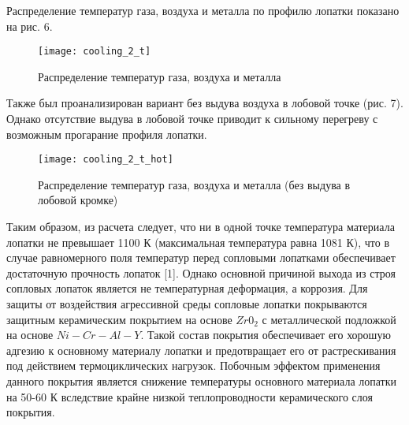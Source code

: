 Распределение температур газа, воздуха и металла по профилю лопатки показано на рис. 6.
\begin{figure}[H]
    \centering
	\texttt{[image: cooling\_2\_t]}
	\caption{Распределение температур газа, воздуха и металла}
\end{figure}

Также был проанализирован вариант без выдува воздуха в лобовой точке (рис. 7). Однако отсутствие выдува в лобовой
точке приводит к сильному перегреву с возможным прогарание профиля лопатки.
\begin{figure}[H]
    \centering
	\texttt{[image: cooling\_2\_t\_hot]}
	\caption{Распределение температур газа, воздуха и металла (без выдува в лобовой кромке)}
\end{figure}

Таким образом, из расчета следует, что ни в одной точке температура материала лопатки не превышает 1100 К (максимальная температура
равна 1081 К), что в случае равномерного поля температур перед сопловыми лопатками обеспечивает достаточную прочность лопаток [1].
Однако основной причиной выхода из строя сопловых лопаток является не температурная деформация, а коррозия.
Для защиты от воздействия агрессивной среды сопловые лопатки покрываются защитным керамическим покрытием на основе
$Zr0_2$ с металлической подложкой на основе $Ni-Cr-Al-Y$. Такой состав покрытия обеспечивает его хорошую адгезию к
основному материалу лопатки и предотвращает его от растрескивания под действием термоциклических нагрузок.
Побочным эффектом применения данного покрытия является снижение температуры основного материала лопатки на 50-60 К
вследствие крайне низкой теплопроводности керамического слоя покрытия.
